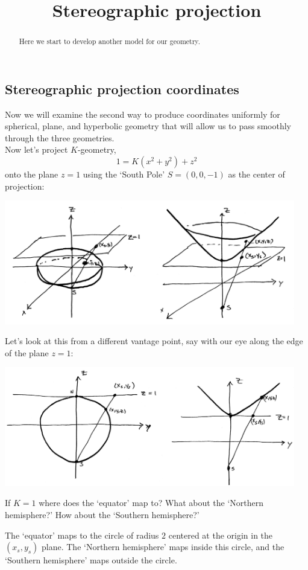 \documentclass{ximera}
\title{Stereographic projection}
\begin{document}
\begin{abstract}
Here we start to develop another model for our geometry.
\end{abstract}
\maketitle


\subsection*{Stereographic projection coordinates}

Now we will examine the second way to produce coordinates uniformly for spherical, plane, and hyperbolic geometry that will allow us to pass smoothly through the three geometries.\\
Now let's project $K$-geometry,
\[
1=K\left(x^{2}+y^{2}\right)+z^{2} 
\]
onto the plane $z=1$ using the `South Pole' $S=(0,0,-1)$ as the center of
projection:
\begin{image}
\includegraphics[width=5in]{stereoProj.png}
\end{image}
Let's look at this from a different vantage point, say with our eye
along the edge of the plane $z=1$:
\begin{image}
\includegraphics[width=5in]{stereoCross.png}
\end{image}

\begin{problem}
  If $K=1$ where does the `equator' map to? What about the `Northern hemisphere?' How about the `Southern hemisphere?'
  \begin{freeResponse}
    The `equator' maps to the circle of radius $2$ centered at the
    origin in the $(x_s,y_s)$ plane.  The `Northern hemisphere' maps
    inside this circle, and the `Southern hemisphere' maps outside the
    circle.
  \end{freeResponse}
\end{problem}
\end{document}
